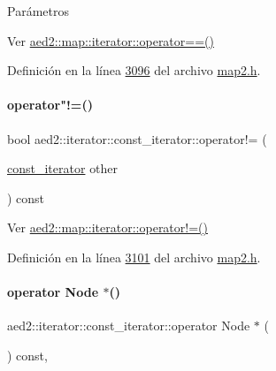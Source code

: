 \begin{DoxyParams}{\-Parámetros}
\begin{DoxyCompactItemize}
Ver \hyperlink{classaed2_1_1map_1_1iterator_a34f6622845af93ca42f1be8516eeafa2_a34f6622845af93ca42f1be8516eeafa2}{aed2\+::map\+::iterator\+::operator==()} 



Definición en la línea \hyperlink{map2_8h_source_l03096}{3096} del archivo \hyperlink{map2_8h_source}{map2.\+h}.

\mbox{\label{classaed2_1_1iterator_1_1const__iterator_ac9d9eb5bae19cd792c4e92dcc0426e81_ac9d9eb5bae19cd792c4e92dcc0426e81}} 
\paragraph{\texorpdfstring{operator"!=()}{operator!=()}}
{\footnotesize\ttfamily bool aed2\+::iterator\+::const\+\_\+iterator\+::operator!= (\begin{DoxyParamCaption}\item[{\hyperlink{classaed2_1_1iterator_1_1const__iterator}{const\+\_\+iterator}}]{other }\end{DoxyParamCaption}) const\hspace{0.3cm}{\ttfamily [inline]}}



Ver \hyperlink{classaed2_1_1map_1_1iterator_a748cdf8c35707d1c2e9ef8ef9d862d37_a748cdf8c35707d1c2e9ef8ef9d862d37}{aed2\+::map\+::iterator\+::operator!=()} 



Definición en la línea \hyperlink{map2_8h_source_l03101}{3101} del archivo \hyperlink{map2_8h_source}{map2.\+h}.

\mbox{\label{classaed2_1_1iterator_1_1const__iterator_af7cb6596f89769b8aa654d3bbb7384ab_af7cb6596f89769b8aa654d3bbb7384ab}} 
\paragraph{\texorpdfstring{operator Node $\ast$()}{operator Node *()}}
{\footnotesize\ttfamily aed2\+::iterator\+::const\+\_\+iterator\+::operator Node $\ast$ (\begin{DoxyParamCaption}{ }\end{DoxyParamCaption}) const\hspace{0.3cm}{\ttfamily [inline]}, {\ttfamily [private]}}




\end{DoxyCompactItemize}
\end{DoxyParams}
